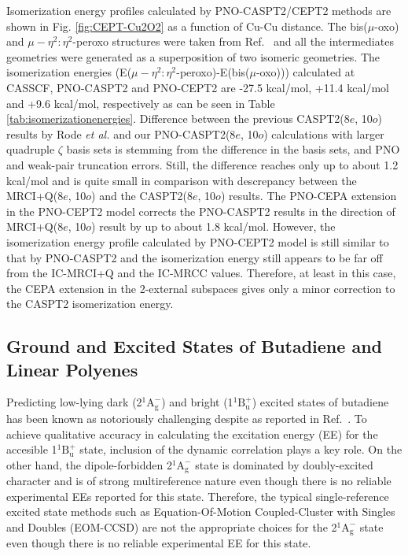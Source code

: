 \documentclass[aip,jcp,amsmath]{revtex4-1}
\begin{document}
%
Isomerization energy profiles calculated by PNO-CASPT2/CEPT2 methods are shown in Fig. \ref{fig:CEPT-Cu2O2} as a function of Cu-Cu distance.
%
The bis($\mu$-oxo) and $\mu-\eta^2:\eta^2$-peroxo structures were taken from Ref.~ and all the intermediates geometries were generated as a superposition of two isomeric geometries.
%
The isomerization energies (E($\mu-\eta^2:\eta^2$-peroxo)-E(bis($\mu$-oxo))) calculated at CASSCF, PNO-CASPT2 and PNO-CEPT2 are -27.5 kcal/mol, +11.4 kcal/mol and +9.6 kcal/mol, respectively as can be seen in Table \ref{tab:isomerizationenergies}.
%
Difference between the previous CASPT2(8$e$, 10$o$) results by Rode {\it et al.} and our PNO-CASPT2(8$e$, 10$o$) calculations with larger quadruple $\zeta$ basis sets is stemming from the difference in the basis sets, and PNO and weak-pair truncation errors. 
%
Still, the difference reaches only up to about 1.2 kcal/mol and is quite small in comparison with descrepancy between the MRCI+Q(8$e$, 10$o$) and the CASPT2(8$e$, 10$o$) results.
%
The PNO-CEPA extension in the PNO-CEPT2 model corrects the PNO-CASPT2 results in the direction of MRCI+Q(8$e$, 10$o$) result by up to about 1.8 kcal/mol.
%
However, the isomerization energy profile calculated by PNO-CEPT2 model is still similar to that by PNO-CASPT2 and the isomerization energy still appears to be far off from the IC-MRCI+Q and the IC-MRCC values.
%
Therefore, at least in this case, the CEPA extension in the 2-external subspaces gives only a minor correction to the CASPT2 isomerization energy. 

\subsection{Ground and Excited States of Butadiene and Linear Polyenes}

%
Predicting low-lying dark (2${}^1\text{A}_\text{g}^{-}$) and bright (1${}^1\text{B}_\text{u}^{+}$) excited states of butadiene has been known as notoriously challenging despite as reported in Ref.~.
%
To achieve qualitative accuracy in calculating the excitation energy (EE) for the accesible 1${}^1\text{B}_\text{u}^{+}$ state, inclusion of the dynamic correlation plays a key role.
%
On the other hand, the dipole-forbidden 2${}^1\text{A}_\text{g}^{-}$ state is dominated by doubly-excited character and is of strong multireference nature even though there is no reliable experimental EEs reported for this state.
%
Therefore, the typical single-reference excited state methods such as Equation-Of-Motion Coupled-Cluster with Singles and Doubles (EOM-CCSD) are not the appropriate choices for the 2${}^1\text{A}_\text{g}^{-}$ state even though there is no reliable experimental EE for this state.
\end{document}
